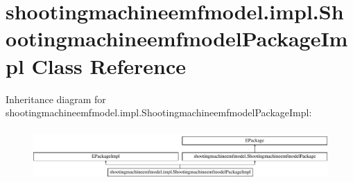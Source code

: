 \hypertarget{classshootingmachineemfmodel_1_1impl_1_1_shootingmachineemfmodel_package_impl}{\section{shootingmachineemfmodel.\-impl.\-Shootingmachineemfmodel\-Package\-Impl Class Reference}
\label{classshootingmachineemfmodel_1_1impl_1_1_shootingmachineemfmodel_package_impl}
}
Inheritance diagram for shootingmachineemfmodel.\-impl.\-Shootingmachineemfmodel\-Package\-Impl\-:\begin{figure}[H]
\begin{center}
\leavevmode
\includegraphics[height=2.014389cm]{classshootingmachineemfmodel_1_1impl_1_1_shootingmachineemfmodel_package_impl}
\end{center}
\end{figure}
